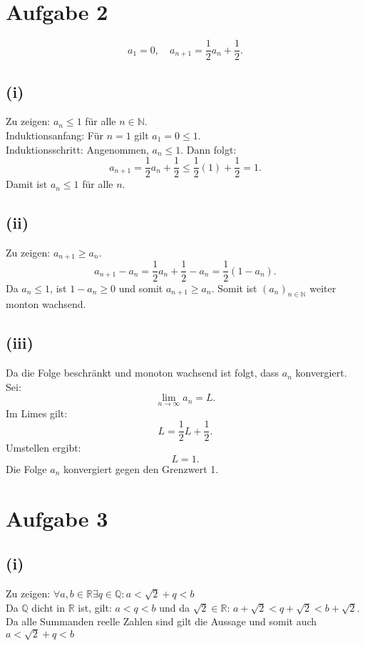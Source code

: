 \documentclass{article}
\begin{document}
\section*{Aufgabe 2}
\[a_1 = 0, \quad a_{n+1} = \frac{1}{2}a_n + \frac{1}{2}.\]

\subsection*{(i)}  
Zu zeigen: \(a_n \leq 1\) für alle \(n \in \mathbb{N}\).  \\
Induktionsanfang: Für \(n = 1\) gilt \(a_1 = 0 \leq 1\). \\
Induktionsschritt: Angenommen, \(a_n \leq 1\). Dann folgt:
    \[a_{n+1} = \frac{1}{2}a_n + \frac{1}{2} \leq \frac{1}{2}(1) + \frac{1}{2} =1.\]
Damit ist \(a_n \leq 1\) für alle \(n\).

\subsection*{(ii)}  
Zu zeigen: \(a_{n+1} \geq a_n\).  
\[a_{n+1} - a_n = \frac{1}{2}a_n + \frac{1}{2} - a_n = \frac{1}{2}(1 - a_n).\]
Da \(a_n \leq 1\), ist \(1 - a_n \geq 0\) und somit \(a_{n+1} \geq a_n\). Somit ist \((a_n)_{n\in \mathbb{N}}\) weiter monton wachsend.

\subsection*{(iii)}  
Da die Folge beschränkt und monoton wachsend ist folgt, dass \(a_n\) konvergiert. Sei:
\[\lim_{n \to \infty} a_n = L.\]
Im Limes gilt:
\[L = \frac{1}{2}L + \frac{1}{2}.\]
Umstellen ergibt:
\[L = 1.\]
Die Folge \(a_n\) konvergiert gegen den Grenzwert 1. 

\section*{Aufgabe 3}
\subsection*{(i)}
Zu zeigen: $\forall a,b \in \mathbb{R} \exists q \in \mathbb{Q}: a < \sqrt{2}+q < b$ \\
Da $\mathbb{Q}$ dicht in $\mathbb{R}$ ist, gilt: $a < q < b$ und da $\sqrt{2} \in \mathbb{R}$: $a + \sqrt{2} < q + \sqrt{2} < b + \sqrt{2}$. \\
Da alle Summanden reelle Zahlen sind gilt die Aussage und somit auch $a < \sqrt{2} + q < b$
\end{document}
